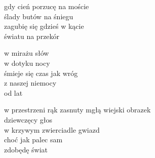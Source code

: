 \begin{text}
    gdy cień porzucę na moście\\
    ślady butów na śniegu\\
    zagubię się gdzieś w kącie\\
    światu na przekór

    w mirażu słów\\
    w dotyku nocy\\
    śmieje się czas jak wróg\\
    z naszej niemocy\\
    od lat

    w przestrzeni rąk zasnuty mgłą wiejski obrazek\\
    dziewczęcy głos\\
    w krzywym zwierciadle gwiazd\\
    choć jak palec sam\\
    zdobędę świat
\end{text}
\begin{chord}

\end{chord}